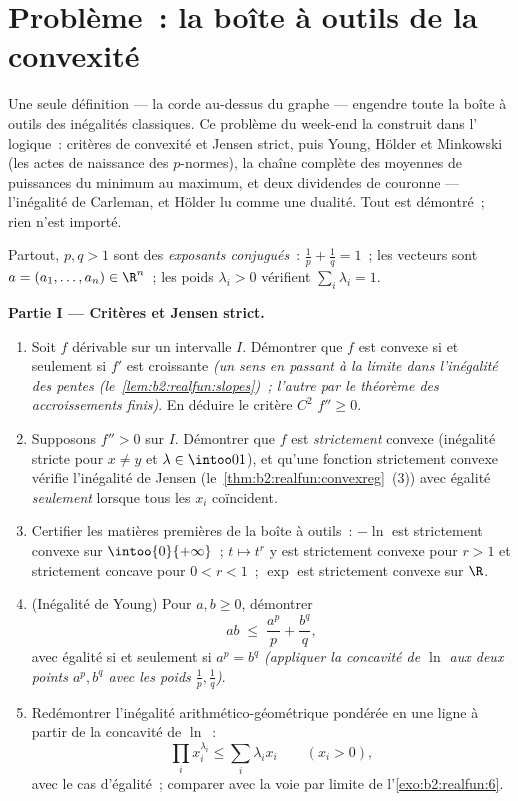 \section{Problème~: la boîte à outils de la convexité}

Une seule définition --- la corde au-dessus du graphe --- engendre
toute la boîte à outils des inégalités classiques. Ce problème du
week-end la construit dans l' logique~: critères de convexité et
Jensen strict, puis Young, Hölder et Minkowski (les actes de
naissance des $p$-normes), la chaîne complète des moyennes de
puissances du minimum au maximum, et deux dividendes de couronne ---
l'inégalité de Carleman, et Hölder lu comme une dualité. Tout est
démontré~; rien n'est importé.

\begin{problem}
\label{pb:b2:realfun:1}
Partout, $p, q > 1$ sont des \emph{exposants conjugués}~: $\frac1p +
\frac1q = 1$~; les vecteurs sont $a = (a_1, \dots, a_n) \in \R^n$~;
les poids $\lambda_i > 0$ vérifient $\sum_i\lambda_i = 1$.

\medskip
\noindent\textbf{Partie I --- Critères et Jensen strict.}
\begin{enumerate}
  \item Soit $f$ dérivable sur un intervalle $I$. Démontrer que
        $f$ est convexe si et seulement si $f'$ est croissante
        \emph{(un sens en passant à la limite dans l'inégalité des
        pentes (le~\cref{lem:b2:realfun:slopes})~; l'autre par le
        théorème des accroissements finis)}. En déduire le critère
        $C^2$ $f'' \geq 0$.
  \item Supposons $f''> 0$ sur $I$. Démontrer que $f$ est
        \emph{strictement} convexe (inégalité stricte pour $x \neq
        y$ et $\lambda \in \intoo01$), et qu'une fonction
        strictement convexe vérifie l'inégalité de Jensen
        (le~\cref{thm:b2:realfun:convexreg}~(3)) avec égalité
        \emph{seulement} lorsque tous les $x_i$ coïncident.
  \item Certifier les matières premières de la boîte à outils~:
        $-\ln$ est strictement convexe sur $\intoo{0}{+\infty}$~; $t
        \mapsto t^r$ y est strictement convexe pour $r > 1$ et
        strictement concave pour $0 < r < 1$~; $\exp$ est strictement
        convexe sur $\R$.
  \item (Inégalité de Young) Pour $a, b \geq 0$, démontrer
        \[
        ab \;\leq\; \frac{a^p}{p} + \frac{b^q}{q},
        \]
        avec égalité si et seulement si $a^p = b^q$ \emph{(appliquer
        la concavité de $\ln$ aux deux points $a^p, b^q$
        avec les poids $\frac1p, \frac1q$)}.
  \item Redémontrer l'inégalité arithmético-géométrique pondérée en
        une ligne à partir de la concavité de $\ln$~:
        \[
        \prod_i x_i^{\lambda_i} \leq \sum_i\lambda_ix_i \qquad
        (x_i > 0),
        \]
        avec le cas d'égalité~; comparer avec la voie par limite de
        l'\cref{exo:b2:realfun:6}.
\end{enumerate}


\end{problem}
